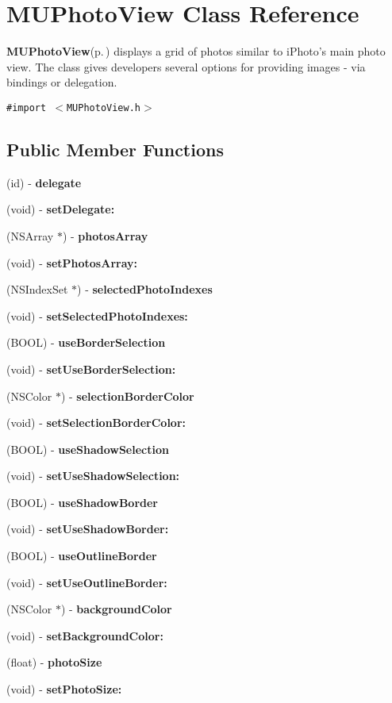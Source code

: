 \section{MUPhoto\-View Class Reference}
\label{interface_m_u_photo_view}
{\bf MUPhoto\-View}{\rm (p.\,\pageref{interface_m_u_photo_view})} displays a grid of photos similar to i\-Photo's main photo view. The class gives developers several options for providing images - via bindings or delegation.  


{\tt \#import $<$MUPhoto\-View.h$>$}

\subsection*{Public Member Functions}
\begin{CompactItemize}
\item 
(id) - {\bf delegate}
\item 
(void) - {\bf set\-Delegate:}
\item 
(NSArray $\ast$) - {\bf photos\-Array}
\item 
(void) - {\bf set\-Photos\-Array:}
\item 
(NSIndex\-Set $\ast$) - {\bf selected\-Photo\-Indexes}
\item 
(void) - {\bf set\-Selected\-Photo\-Indexes:}
\item 
(BOOL) - {\bf use\-Border\-Selection}
\item 
(void) - {\bf set\-Use\-Border\-Selection:}
\item 
(NSColor $\ast$) - {\bf selection\-Border\-Color}
\item 
(void) - {\bf set\-Selection\-Border\-Color:}
\item 
(BOOL) - {\bf use\-Shadow\-Selection}
\item 
(void) - {\bf set\-Use\-Shadow\-Selection:}
\item 
(BOOL) - {\bf use\-Shadow\-Border}
\item 
(void) - {\bf set\-Use\-Shadow\-Border:}
\item 
(BOOL) - {\bf use\-Outline\-Border}
\item 
(void) - {\bf set\-Use\-Outline\-Border:}
\item 
(NSColor $\ast$) - {\bf background\-Color}
\item 
(void) - {\bf set\-Background\-Color:}
\item 
(float) - {\bf photo\-Size}
\item 
(void) - {\bf set\-Photo\-Size:}
\end{CompactItemize}


